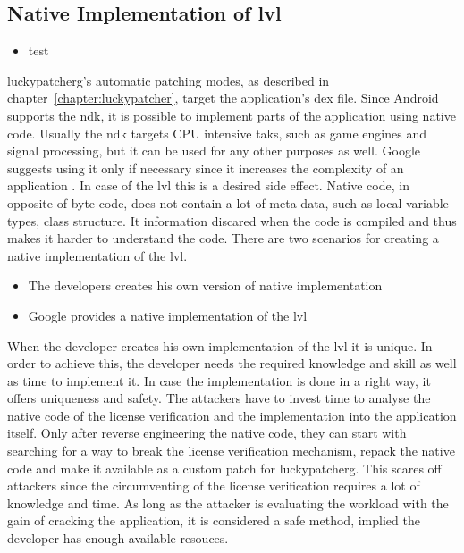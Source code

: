 \subsection{Native Implementation of \gls{lvl}} \label{subsection:counter-modifications-dynamic}
\begin{itemize}
    \item test
\end{itemize}

\gls{luckypatcherg}'s automatic patching modes, as described in chapter~\ref{chapter:luckypatcher}, target the application's \gls{dex} file.
Since Android supports the \gls{ndk}, it is possible to implement parts of the application using native code.
\newline
Usually the \gls{ndk} targets CPU intensive taks, such as game engines and signal processing, but it can be used for any other purposes as well.
Google suggests using it only if necessary since it increases the complexity of an application \cite{androidNdk}.
In case of the \gls{lvl} this is a desired side effect.
Native code, in opposite of byte-code, does not contain a lot of meta-data, such as local variable types, class structure.
It information discared when the code is compiled and thus makes it harder to understand the code.
\newline
There are two scenarios for creating a native implementation of the \gls{lvl}.
\begin{itemize}
  \item The developers creates his own version of native implementation
  \item Google provides a native implementation of the \gls{lvl}
\end{itemize}
When the developer creates his own implementation of the \gls{lvl} it is unique.
In order to achieve this, the developer needs the required knowledge and skill as well as time to implement it.
In case the implementation is done in a  right way, it offers uniqueness and safety.
The attackers have to invest time to analyse the native code of the license verification and the implementation into the application itself.
Only after reverse engineering the native code, they can start with searching for a way to break the license verification mechanism, repack the native code and make it available as a custom patch for \gls{luckypatcherg}.
This scares off attackers since the circumventing of the license verification requires a lot of knowledge and time.
As long as the attacker is evaluating the workload with the gain of cracking the application, it is considered a safe method, implied the developer has enough available resouces. \cite{munteanLicense}
